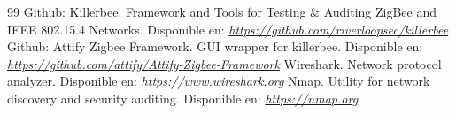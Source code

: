 \begin{thebibliography}{99}
 Github: Killerbee. Framework and Tools for Testing \& Auditing ZigBee and IEEE 802.15.4 Networks. Disponible en: {\it\url{
https://github.com/riverloopsec/killerbee}}
 Github: Attify Zigbee Framework. GUI wrapper for killerbee. Disponible en: {\it\url{
https://github.com/attify/Attify-Zigbee-Framework}}
 Wireshark. Network protocol analyzer. Disponible en: {\it\url{
https://www.wireshark.org}}
 Nmap. Utility for network discovery and security auditing. Disponible en: {\it\url{
https://nmap.org}}
\end{thebibliography}

